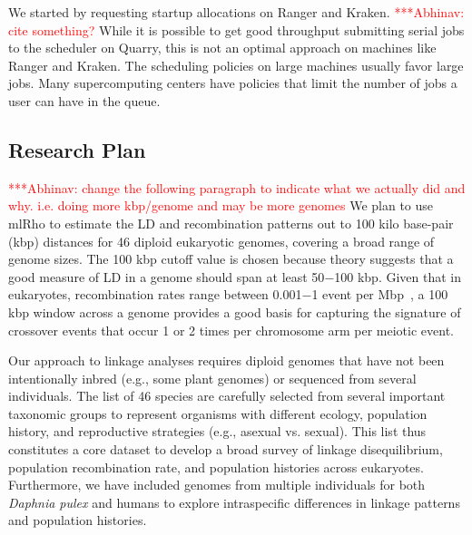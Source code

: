 \documentclass{sig-alternate}
\newcommand{\abhi}[1]{ {\textcolor{red} { ***Abhinav: #1 }}}
\newcommand{\abhi}[1]{ {}}
\begin{document}
We started by requesting startup allocations on Ranger and Kraken.  \abhi{cite something?} While it is possible to get good throughput submitting serial jobs to the scheduler on Quarry, this is not an optimal approach on machines like Ranger and Kraken. The scheduling policies on large machines usually favor large jobs. Many supercomputing centers have policies that limit the number of jobs a user can have in the queue. 


\subsection{Research Plan}\label{sec:plan}

\abhi{change the following paragraph to indicate what we actually did and why. i.e. doing more kbp/genome and may be more genomes}
We plan to use mlRho to estimate the LD and recombination patterns out to 100 kilo base-pair (kbp) distances for 46 diploid eukaryotic genomes, covering a broad range of genome sizes.%
The 100 kbp cutoff value is chosen because theory suggests that a good measure
of LD in a genome should span at least 50$-$100 kbp. Given that in eukaryotes, recombination rates range
between 0.001$-$1 event per Mbp~\cite{annurev-genom-082410-101412}, a 100 kbp window across a genome provides
a good basis for capturing the signature of crossover events that occur 1 or 2 times per chromosome arm per
meiotic event.

Our approach to linkage analyses requires diploid genomes that have not been intentionally inbred  (e.g., some plant genomes) or sequenced from several individuals. The list of 46 species are carefully selected from several important taxonomic groups to represent organisms with different ecology, population history, and reproductive strategies  (e.g., asexual vs. sexual). This list  thus constitutes a core dataset to develop a broad survey of linkage disequilibrium, population recombination rate, and population histories across eukaryotes. Furthermore, we have included genomes from multiple individuals for both {\it Daphnia pulex} and humans to explore intraspecific differences in linkage patterns and population histories. 
\end{document}
